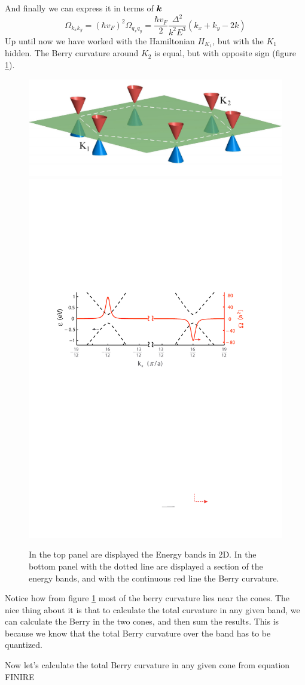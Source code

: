 And finally we can express it in terms of $\boldsymbol{k}$
\begin{equation}
    \Omega_{k_xk_y}=(\hbar v_F)^2\Omega_{q_xq_y}=\frac {\hbar v_F}2 \frac{\Delta^2}{k^2E^3}(k_x+k_y-2k)
\end{equation}
Up until now we have worked with the Hamiltonian $H_{K_1}$, but with the $K_1$ hidden. The Berry curvature around $K_2$ is equal, but with opposite sign (figure \ref{fig:cones}).\\
\begin{figure}
    \centering
    \includegraphics[width=0.7\linewidth]{Immagini/ValleyHall/band_graphene.pdf}
    \includegraphics[width=0.7\linewidth]{Immagini/ValleyHall/curvature_graphene.pdf}
    \caption{In the top panel are displayed the Energy bands in 2D. In the bottom panel with the dotted line are displayed a section of the energy bands, and with the continuous red line the Berry curvature.}
    \label{fig:cones}
\end{figure}
Notice how from figure \ref{fig:cones} most of the berry curvature lies near the cones. The nice thing about it is that to calculate the total curvature in any given band, we can calculate the Berry in the two cones, and then sum the results. This is because we know that the total Berry curvature over the band has to be quantized.

Now let's calculate the total Berry curvature in any given cone from equation FINIRE